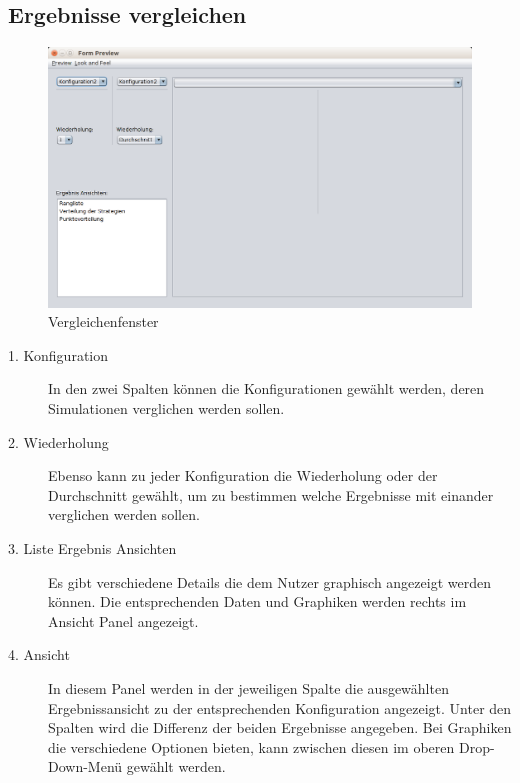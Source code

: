 \pagebreak


\subsection{Ergebnisse vergleichen}

\begin{figure}[hp] 
  \centering
     \includegraphics[width=1.15\textwidth]{GUI_Entwurf/Vergleichfenster.png}
  \caption{Vergleichenfenster}
  \label{fig:Bild1}
\end{figure}

\begin{description}

\item[1. Konfiguration] In den zwei Spalten können die Konfigurationen gewählt werden, deren Simulationen verglichen werden sollen.

\item[2. Wiederholung] Ebenso kann zu jeder Konfiguration die Wiederholung oder der Durchschnitt gewählt, um zu bestimmen welche Ergebnisse mit einander verglichen werden sollen.

\item[3. Liste Ergebnis Ansichten] Es gibt verschiedene Details die dem Nutzer graphisch angezeigt werden können. Die entsprechenden Daten und Graphiken werden rechts im Ansicht Panel angezeigt.


\item[4. Ansicht] In diesem Panel werden in der jeweiligen Spalte die ausgewählten Ergebnissansicht zu der entsprechenden Konfiguration angezeigt. Unter den Spalten wird die Differenz der beiden Ergebnisse angegeben. Bei Graphiken die verschiedene Optionen bieten, kann zwischen diesen im oberen Drop-Down-Menü gewählt werden.

\end{description}




